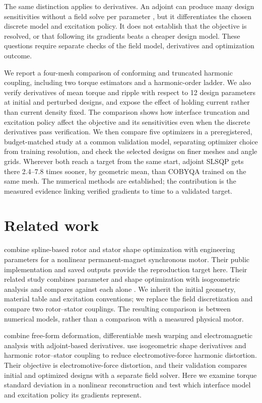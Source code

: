 \documentclass{anvil-paper}
\begin{document}
The same distinction applies to derivatives. An adjoint can produce many
design sensitivities without a field solve per parameter
\citep{scotzniovsky2025}, but it differentiates the chosen discrete model
and excitation policy. It does not establish that the objective is
resolved, or that following its gradients beats a cheaper design model.
These questions require separate checks of the field model, derivatives
and optimization outcome.

We report a four-mesh comparison of conforming and truncated harmonic
coupling, including two torque estimators and a harmonic-order ladder.
We also verify derivatives of mean torque and ripple with respect to
12 design parameters at initial and perturbed designs, and expose the
effect of holding current rather than current density fixed. The
comparison shows how interface truncation and excitation policy affect
the objective and its sensitivities even when the discrete derivatives pass
verification. We then compare five optimizers in a preregistered,
budget-matched study at a common validation model, separating optimizer
choice from training resolution, and check the selected designs on finer
meshes and angle grids. Wherever both reach a target from the same start,
adjoint SLSQP gets there 2.4--7.8 times sooner, by geometric mean, than
COBYQA trained on the same mesh. The numerical methods are established;
the contribution is the measured evidence linking verified gradients to
time to a validated target.

\section{Related work}
\citet{wiesheu2024spline} combine spline-based rotor and stator shape
optimization with engineering parameters for a nonlinear permanent-magnet
synchronous motor. Their public implementation and saved outputs provide
the reproduction target here. Their related study combines parameter and
shape optimization with isogeometric analysis and compares against each alone
\citep{wiesheu2025combined}. We inherit the initial geometry, material
table and excitation conventions; we replace the field discretization and compare two
rotor--stator couplings. The resulting comparison is between numerical
models, rather than a comparison with a measured physical motor.

\citet{scotzniovsky2025} combine free-form deformation, differentiable
mesh warping and electromagnetic analysis with adjoint-based derivatives.
\citet{merkel2021shape} use isogeometric shape derivatives and harmonic
rotor--stator coupling to reduce electromotive-force harmonic distortion.
Their objective is electromotive-force distortion, and their validation
compares initial and optimized designs with a separate field solver.
Here we examine torque standard deviation in a nonlinear reconstruction
and test which interface model and excitation policy its gradients represent.
\end{document}
